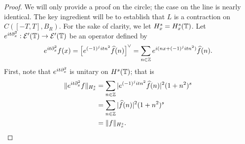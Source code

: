 \begin{proof} We will only provide a proof on the circle; the case on 
the line is nearly identical. The key ingredient
will be to establish that $L$ is a 
contraction on $C([-T, T], B_R)$. For the sake of clarity, we let $H^s_x 
= H^s_x(\mathbb{T})$. Let $e^{it \partial_x^2}: \mathcal{E}'(\mathbb{T}) \to 
\mathcal{E}'(\mathbb{T})$ be an operator defined by  
%
%
\begin{equation}
  \label{unit-op}
  \begin{split}
    e^{it \partial_x^2} f(x) = \left[ e^{(-1)^j i t n^2} \widehat{f}(n)
    \right]^{\vee} = 
    \sum_{n \in \mathbb{Z}} e^{i(nx + (-1)^j it n^2)} \widehat{f}(n).
  \end{split}
\end{equation}
%
%
First, note that $e^{it \partial_x^2}$ 
is unitary on $H^s(\mathbb{T})$; that is
%
%
\begin{equation}
  \label{unitary-op}
  \begin{split}
    \|e^{it \partial_x^2} f \|_{H^s_x} & = \sum_{n \in \mathbb{Z}} |e^{(-1)^j it n^2} 
    \widehat{f}(n)|^2 (1 + n^2)^s  
    \\
    & = \sum_{n \in \mathbb{Z}} |\widehat{f}(n)|^2 (1 + n^2)^s 
    \\
    & = \|f\|_{H^s_x}.
  \end{split}
\end{equation}


\end{proof}
